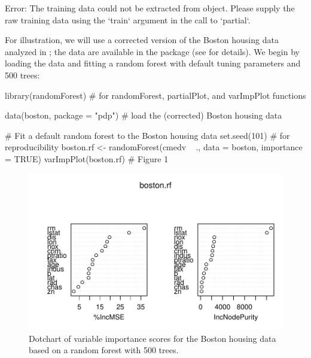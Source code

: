\begin{example}
Error: The training data could not be extracted from object. Please supply
the raw training data using the `train` argument in the call to `partial`.
\end{example}

For illustration, we will use a corrected version of the Boston housing
data analyzed in \citet{harrison-1978-hedonic}; the data are available
in the  package (see  for details). We begin
by loading the data and fitting a random forest with default tuning
parameters and 500 trees:

\begin{Schunk}
\begin{Sinput}
library(randomForest)  # for randomForest, partialPlot, and varImpPlot functions

data(boston, package = "pdp")  # load the (corrected) Boston housing data

# Fit a default random forest to the Boston housing data
set.seed(101)  # for reproducibility
boston.rf <- randomForest(cmedv ~ ., data = boston, importance = TRUE)
varImpPlot(boston.rf)  # Figure 1
\end{Sinput}
\begin{figure}[!htb]

{\centering \includegraphics[width=1\linewidth]{greenwell_files/figure-latex/boston-vip-1} 

}

\caption[Dotchart of variable importance scores for the Boston housing data based on a random forest with 500 trees]{Dotchart of variable importance scores for the Boston housing data based on a random forest with 500 trees.}\label{fig:boston-vip}
\end{figure}
\end{Schunk}

